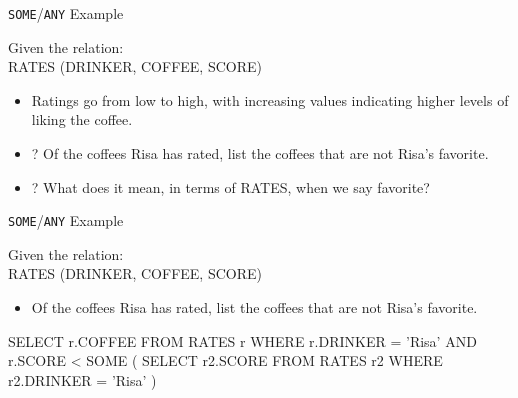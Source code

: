 \documentclass[aspectratio=169]{beamer}
\newenvironment{noindentitemize}
{ \begin{itemize}
 \setlength{\itemsep}{1.5ex}
  \setlength{\parsep}{0pt}   
  \setlength{\parskip}{0pt}
 \addtolength{\leftskip}{-2em}
 }
{ \end{itemize} }
\begin{document}
\begin{frame}{\texttt{SOME}/\texttt{ANY} Example}

Given the relation:\\
RATES (DRINKER, COFFEE, SCORE)\\

\begin{noindentitemize}
\item Ratings go from low to high, with increasing values indicating higher levels of liking the coffee.
\item[?] Of the coffees Risa has rated, list the coffees that are not Risa's favorite. 
\item[?] What does it mean, in terms of RATES, when we say favorite?
\end{noindentitemize}

\end{frame}

\begin{frame}[fragile]{\texttt{SOME}/\texttt{ANY} Example}

Given the relation:\\
RATES (DRINKER, COFFEE, SCORE)\\

\begin{itemize}
\item Of the coffees Risa has rated, list the coffees that are not Risa's favorite. 
\end{itemize}


\begin{SQL}
SELECT r.COFFEE
FROM RATES r
WHERE r.DRINKER = 'Risa' AND r.SCORE < SOME (
  SELECT r2.SCORE 
  FROM RATES r2
  WHERE r2.DRINKER = 'Risa' )
\end{SQL}

\end{frame}
\end{document}
